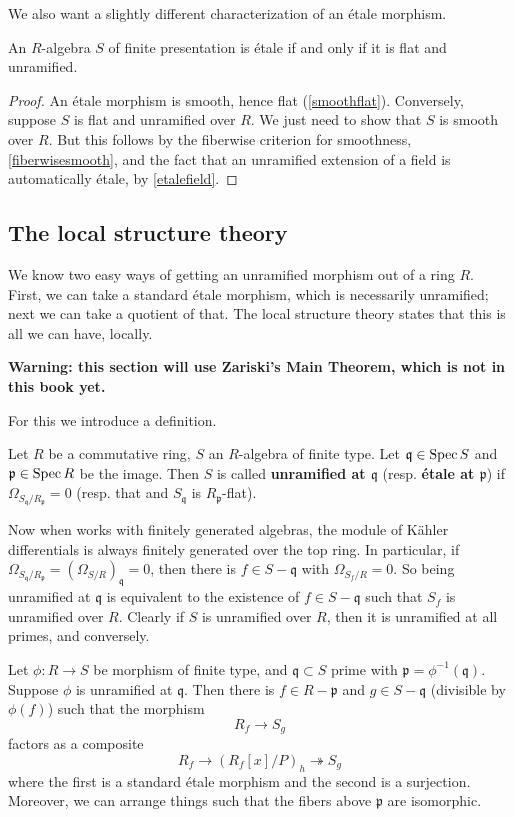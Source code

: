 We also want a slightly different characterization of an \'etale morphism.
\begin{theorem} 
An $R$-algebra $S$ of finite presentation is \'etale if and only if
it is flat and unramified.
\end{theorem} 
\begin{proof} 
An \'etale morphism is smooth, hence flat (\cref{smoothflat}). Conversely,
suppose $S$ is flat and unramified over $R$. We just need to show that $S$ is
smooth over $R$. But this follows by the fiberwise criterion for smoothness,
\cref{fiberwisesmooth}, and the fact that an unramified extension of a
field is automatically \'etale, by \cref{etalefield}.
\end{proof} 


\subsection{The local structure theory}
We know two easy ways of getting an unramified morphism out of a ring $R$.
First, we can take a standard \'etale morphism, which is necessarily
unramified; next we can take a quotient of that. The local structure theory
states that this is all we can have, locally.

\textbf{Warning: this section will use Zariski's Main Theorem, which is not in
this book yet.}


For this we introduce a definition.

\begin{definition} 
Let $R$ be a commutative ring, $S$ an $R$-algebra of finite type. Let $\mathfrak{q} \in \operatorname{Spec}
S$ and $\mathfrak{p} \in \operatorname{Spec} R$ be the image. Then $S$ is called
\textbf{unramified at $\mathfrak{q}$} (resp. \textbf{\'etale at
$\mathfrak{p}$}) if $\Omega_{S_{\mathfrak{q}}/R_{\mathfrak{p}}} = 0$ (resp.
that and $S_{\mathfrak{q}}$ is $R_{\mathfrak{p}}$-flat).
\end{definition} 

Now when works with finitely generated algebras, the module of K\"ahler
differentials is always finitely generated over the top ring. 
In particular, if 
$\Omega_{S_{\mathfrak{q}}/R_{\mathfrak{p}}} = (\Omega_{S/R} )_{\mathfrak{q}} =
0$, then there is $f \in S - \mathfrak{q}$ with $\Omega_{S_f/R} = 0$.
So being unramified at $\mathfrak{q}$ is equivalent to the existence of $f \in
S-\mathfrak{q}$ such that $S_f$ is unramified over $R$.
Clearly if $S$ is unramified over $R$, then it is unramified at all primes,
and conversely.


\begin{theorem} 
Let $\phi: R \to S$ be  morphism of finite type, and $\mathfrak{q} \subset S$ prime
with $\mathfrak{p} = \phi^{-1}(\mathfrak{q})$. Suppose $\phi$ is unramified at
$\mathfrak{q}$.
Then there is $f \in R- \mathfrak{p}$ and $g \in S - \mathfrak{q}$ (divisible
by $\phi(f)$) such that
the morphism
\[ R_f \to S_g  \]
factors as a composite
\[ R_f \to (R_f[x]/P)_{h} \twoheadrightarrow S_g  \]
where the first is a standard \'etale morphism and the second is a
surjection. Moreover, we can arrange things such that the fibers above
$\mathfrak{p}$ are isomorphic.
\end{theorem} 


